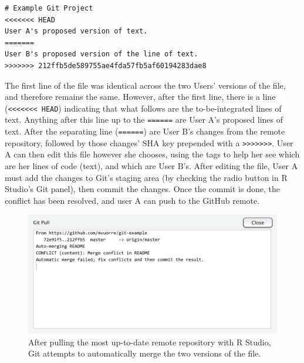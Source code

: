 \documentclass[
  american,
  ,doc,floatsintext]{apa6}
\begin{document}
\begin{verbatim}
# Example Git Project
<<<<<<< HEAD
User A's proposed version of text.
=======
User B's proposed version of the line of text.
>>>>>>> 212ffb5de589755ae4fda57fb5af60194283dae8
\end{verbatim}

The first line of the file was identical across the two Users' versions of the file, and therefore remains the same. However, after the first line, there is a line (\texttt{\textless{}\textless{}\textless{}\textless{}\textless{}\textless{}\textless{}\ HEAD}) indicating that what follows are the to-be-integrated lines of text. Anything after this line up to the \texttt{======} are User A's proposed lines of text. After the separating line (\texttt{======}) are User B's changes from the remote repository, followed by those changes' SHA key prepended with a \texttt{\textgreater{}\textgreater{}\textgreater{}\textgreater{}\textgreater{}\textgreater{}\textgreater{}}. User A can then edit this file however she chooses, using the tags to help her see which are her lines of code (text), and which are User B's. After editing the file, User A must add the changes to Git's staging area (by checking the radio button in R Studio's Git panel), then commit the changes. Once the commit is done, the conflict has been resolved, and user A can push to the GitHub remote.

\begin{figure}

{\centering \includegraphics{images/rstudio-git-pull-merge} 

}

\caption{After pulling the most up-to-date remote repository with R Studio, Git attempts to automatically merge the two versions of the file.}\label{fig:rstudio-git-pull-merge}
\end{figure}
\end{document}
